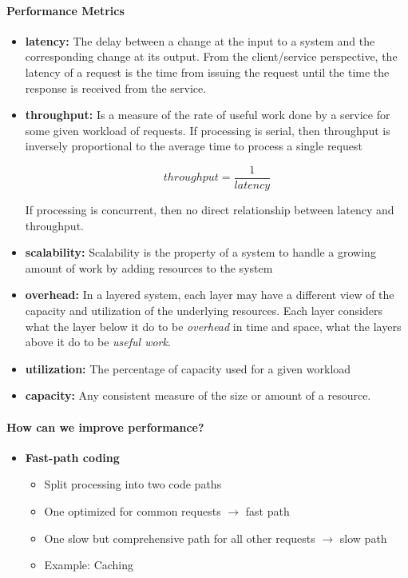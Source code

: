 \paragraph{Performance Metrics}
\begin{itemize}
\item \textbf{latency:} The delay between a change at the input to a
  system and the corresponding change at its output. From
  the client/service perspective, the latency of a request is the
  time from issuing the request until the time the response
  is received from the service.

\item \textbf{throughput:} Is a measure of the rate of useful work
  done by a service for some given workload of requests.
  If processing is serial, then throughput is inversely
  proportional to the average time to process a single request

  $$ throughput = \frac{1}{latency} $$

  If processing is concurrent, then no direct relationship between
  latency and throughput.

\item \textbf{scalability:} Scalability is the property of a system to handle a growing amount of work by adding resources to the system

\item \textbf{overhead:} In a layered system, each layer may have
  a different view of the capacity and utilization of the underlying
  resources. Each layer considers what the layer below it do to
  be \textit{overhead} in time and space, what the
  layers above it do to be \textit{useful work}.

\item \textbf{utilization:} The percentage of capacity used
  for a given workload

\item \textbf{capacity:} Any consistent measure of the size or amount
  of a resource.
\end{itemize}

\paragraph{How can we improve performance?}
\begin{itemize}
\item \textbf{Fast-path coding}
  \begin{itemize}
  \item Split processing into two code paths
  \item One optimized for common requests $\rightarrow$ fast path
  \item One slow but comprehensive path for all other
    requests $\rightarrow$ slow path
  \item Example: Caching
  \end{itemize}
\end{itemize}

